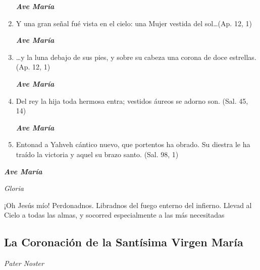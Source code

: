 \documentclass[a4paper,11pt, oneside]{report}
\begin{document}
\begin{enumerate}
        \textbf{\textit{Ave María}}

        \item Y una gran señal fué vista en el cielo: una Mujer vestida del sol\ldots (Ap. 12, 1)

        \textbf{\textit{Ave María}}

        \item {\ldots}y la luna debajo de sus pies, y sobre su cabeza una corona de doce estrellas. (Ap. 12, 1)

        \textbf{\textit{Ave María}}

        \item Del rey la hija toda hermosa entra; vestidos áureos se adorno son. (Sal. 45, 14)

        \textbf{\textit{Ave María}}

        \item Entonad a Yahveh cántico nuevo, que portentos ha obrado. Su diestra le ha traído la victoria y aquel su brazo santo. (Sal. 98, 1)

      \end{enumerate}

      \textbf{\textit{Ave María}} \par
      \indent\textit{Gloria} \par
      \indent¡Oh Jesús mío! Perdonadnos. Libradnos del fuego enterno del infierno. Llevad al Cielo a todas las almas, y socorred especialmente a las más 
      necesitadas

    \subsection*{La Coronación de la Santísima Virgen María }

      \textit{Pater Noster}
\end{document}
